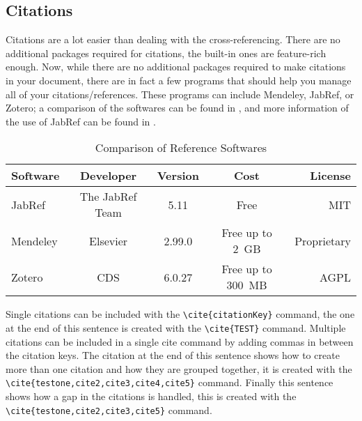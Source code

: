 		\subsection{Citations}\label{subsec:citations}
			Citations are a lot easier than dealing with the cross-referencing.
			There are no additional packages required for citations, the built-in ones are feature-rich enough.
			Now, while there are no additional packages required to make citations in your document, there are in fact a few programs that should help you manage all of your citations/references.
			These programs can include Mendeley, JabRef, or Zotero; a comparison of the softwares can be found in , and more information of the use of JabRef can be found in .
			\begin{table}[htbp]
				\centering
				\caption{Comparison of Reference Softwares}
				\label{tab:refSoftware}%
				\begin{tabularx}{0.95\textwidth}{Lcccr}
					\toprule
						Software & Developer         & Version & Cost                    & License \\
					\midrule
						JabRef   & The JabRef Team   & 5.11     & Free                    & MIT \\
						Mendeley & Elsevier          & 2.99.0   & {Free up to 2~GB}    & Proprietary \\
						Zotero   & CDS               & 6.0.27   & {Free  up to 300~MB} & AGPL  \\
					\bottomrule
				\end{tabularx}%
			\end{table}%
			Single citations can be included with the \lstinline|\cite{citationKey}| command, the one at the end of this sentence is created with the \lstinline|\cite{TEST}| command\cite{TEST}. 
			Multiple citations can be included in a single cite command by adding commas in between the citation keys. 
			The citation at the end of this sentence shows how to create more than one citation and how they are grouped together, it is created with the \lstinline|\cite{testone,cite2,cite3,cite4,cite5}| command\cite{testone,cite2,cite3,cite4,cite5}.
			Finally this sentence shows how a gap in the citations is handled, this is created with the \lstinline|\cite{testone,cite2,cite3,cite5}| command\cite{testone,cite2,cite3,cite5}. 
